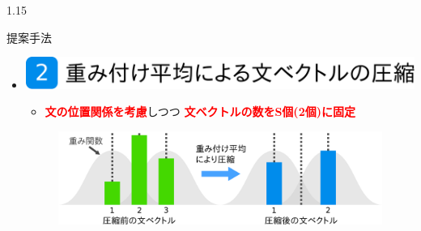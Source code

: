 \documentclass[unicode,10pt]{beamer}
\newlength{\mycolumnwidth}
\newlength{\mytitlefigureheight}
\newcommand{\itemtitle}[1]{\textbf{#1}\\}
\newcommand{\fire}[1]{\textcolor{red}{\textbf{#1}}}
\newcommand{\doublecolumns}[4]{
    \begin{minipage}[t]{#1}
      #2
    \end{minipage}
    \begin{minipage}[t]{#3}
      #4
    \end{minipage}}
\begin{document}
\begin{frame}[t]
\begin{columns}[onlytextwidth,t]
\begin{column}{1.15\mycolumnwidth}
\begin{block}{提案手法}
    \begin{itemize}
      \item \itemtitle{\includegraphics[height=\mytitlefigureheight]
                                       {fig/poster_model_title_2.pdf}}
        \begin{itemize}
          \item \fire{文の位置関係を考慮}しつつ
                \fire{文ベクトルの数をS個(2個)に固定}
        \end{itemize}
        \begin{figure}
          \includegraphics[width=\linewidth]
                          {fig/what_are_you_weighting_for.pdf}
        \end{figure}

\end{itemize}
\end{block}
\end{column}
\end{columns}
\end{frame}
\end{document}

